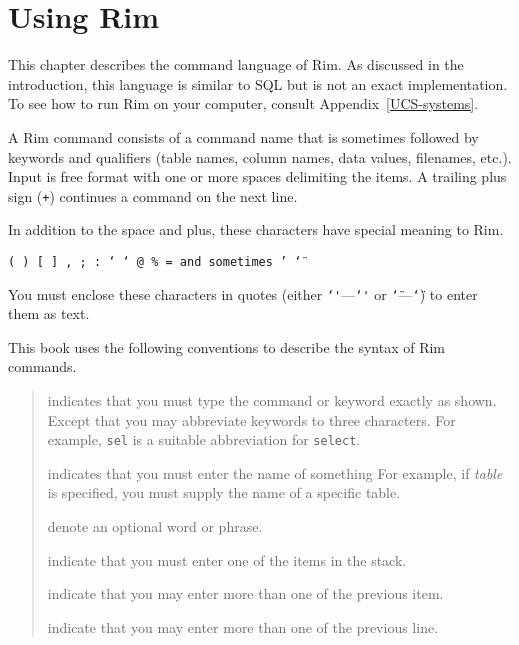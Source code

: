 \documentclass[11pt,a4paper]{report}
\begin{document}
\chapter{Using Rim}
\label{cmd-chapter}
This chapter describes the command language of Rim.
As discussed in the introduction, this language is similar to
SQL but is not an exact implementation.
To see how to run Rim on your computer, consult Appendix~\ref{UCS-systems}.
 
A Rim command consists of a command name that is sometimes followed by
keywords and qualifiers (table names, column names, data values,
filenames, etc.).
Input is free format with one or more spaces delimiting
the items.
A trailing plus sign (\verb!+!) continues a command on
the next line.
 
In addition to the space and plus, these characters have
special meaning to Rim.

{\tt (~)~[~]~,~;~:~\char`\<~\char`~@~\%~= 
\rm and sometimes \tt ' \char`\"}

You must enclose these characters in quotes 
(either {\tt\char`\'}---{\tt\char`\'} or
{\tt\char`\"}---{\tt\char`\"}) to enter them as text.

\medskip
 
This book uses the following conventions to
describe the syntax of Rim commands.
 
\medskip
\begin{quote}
    {\centering {} \par}
  \nopagebreak \medskip
  indicates that you must type the command or keyword
  exactly as shown.  Except that you may abbreviate keywords
  to three characters. For example,
  \verb!sel! is a suitable abbreviation for \verb!select!.
 
  \bigskip
 
     {\centering {}\par}
  \nopagebreak \medskip
  indicates that you must enter the name of something
  For example, if \emph{table} is specified,
  you must supply the name of a specific table.
 
  \bigskip
 
     {\centering  {}\par}
  \nopagebreak \medskip
  denote an optional word or phrase.
 
  \bigskip
 
     {\centering {}\par}
  \nopagebreak \medskip
  indicate that you must enter one
  of the items in the stack.
 
  \bigskip
 
{\centering \fbox{\strut\ \ldots\ }\par}
  \nopagebreak \medskip
  indicate that you may enter more than one of the previous item.
  \bigskip
 
     {\centering \fbox{\strut\ \vdots\ }\par}
  \nopagebreak \medskip
  indicate that you may enter more than one of the previous line.
 
\end{quote}
 
\end{document}
